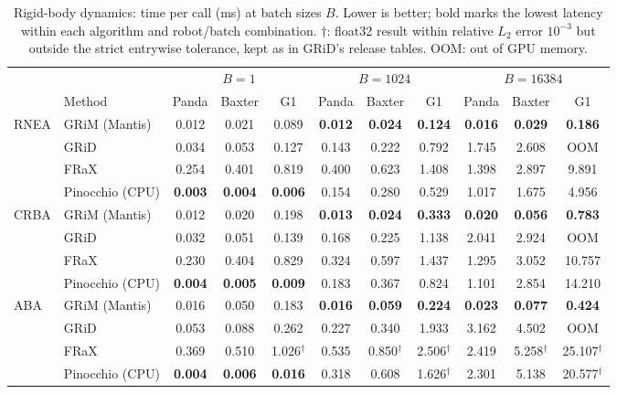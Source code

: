 \begin{table}[t]
  \centering
  \caption{Rigid-body dynamics: time per call (ms) at batch sizes $B$. Lower is better; bold marks the lowest latency within each algorithm and robot/batch combination. $\dagger$: float32 result within relative $L_2$ error $10^{-3}$ but outside the strict entrywise tolerance, kept as in GRiD's release tables. OOM: out of GPU memory.}
  \label{tab:dynamics}
  \footnotesize
  \setlength{\tabcolsep}{4pt}
  \begin{tabular}{llccccccccc}
    \toprule
    & & \multicolumn{3}{c}{$B = 1$} & \multicolumn{3}{c}{$B = 1024$} & \multicolumn{3}{c}{$B = 16384$} \\
    \cmidrule(lr){3-5}\cmidrule(lr){6-8}\cmidrule(lr){9-11}
    & Method & Panda & Baxter & G1 & Panda & Baxter & G1 & Panda & Baxter & G1 \\
    \midrule
    \multirow{4}{*}{RNEA}
      & GRiM (Mantis) & 0.012 & 0.021 & 0.089 & \textbf{0.012} & \textbf{0.024} & \textbf{0.124} & \textbf{0.016} & \textbf{0.029} & \textbf{0.186} \\
      & GRiD & 0.034 & 0.053 & 0.127 & 0.143 & 0.222 & 0.792 & 1.745 & 2.608 & OOM \\
      & FRaX & 0.254 & 0.401 & 0.819 & 0.400 & 0.623 & 1.408 & 1.398 & 2.897 & 9.891 \\
      & Pinocchio (CPU) & \textbf{0.003} & \textbf{0.004} & \textbf{0.006} & 0.154 & 0.280 & 0.529 & 1.017 & 1.675 & 4.956 \\
    \midrule
    \multirow{4}{*}{CRBA}
      & GRiM (Mantis) & 0.012 & 0.020 & 0.198 & \textbf{0.013} & \textbf{0.024} & \textbf{0.333} & \textbf{0.020} & \textbf{0.056} & \textbf{0.783} \\
      & GRiD & 0.032 & 0.051 & 0.139 & 0.168 & 0.225 & 1.138 & 2.041 & 2.924 & OOM \\
      & FRaX & 0.230 & 0.404 & 0.829 & 0.324 & 0.597 & 1.437 & 1.295 & 3.052 & 10.757 \\
      & Pinocchio (CPU) & \textbf{0.004} & \textbf{0.005} & \textbf{0.009} & 0.183 & 0.367 & 0.824 & 1.101 & 2.854 & 14.210 \\
    \midrule
    \multirow{4}{*}{ABA}
      & GRiM (Mantis) & 0.016 & 0.050 & 0.183 & \textbf{0.016} & \textbf{0.059} & \textbf{0.224} & \textbf{0.023} & \textbf{0.077} & \textbf{0.424} \\
      & GRiD & 0.053 & 0.088 & 0.262 & 0.227 & 0.340 & 1.933 & 3.162 & 4.502 & OOM \\
      & FRaX & 0.369 & 0.510 & 1.026$^\dagger$ & 0.535 & 0.850$^\dagger$ & 2.506$^\dagger$ & 2.419 & 5.258$^\dagger$ & 25.107$^\dagger$ \\
      & Pinocchio (CPU) & \textbf{0.004} & \textbf{0.006} & \textbf{0.016} & 0.318 & 0.608 & 1.626$^\dagger$ & 2.301 & 5.138 & 20.577$^\dagger$ \\
    \bottomrule
  \end{tabular}
\end{table}
